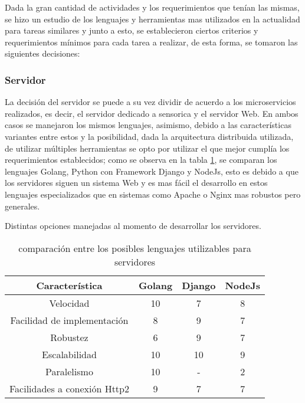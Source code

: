    Dada la gran cantidad de actividades y los requerimientos que tenían las mismas,
    se hizo un estudio de los lenguajes y herramientas mas utilizados en
    la actualidad para tareas similares y junto a esto, se establecieron
    ciertos criterios y requerimientos mínimos para cada tarea a realizar, de
    esta forma, se tomaron las siguientes decisiones:

    \subsubsection{Servidor}
    La decisión del servidor se puede a su vez dividir de acuerdo a los
    microservicios realizados, es decir, el servidor dedicado a sensorica y
    el servidor Web. En ambos casos se manejaron los mismos lenguajes, asimismo, debido a
    las características variantes entre estos y la posibilidad, dada la arquitectura
    distribuida utilizada, de utilizar múltiples herramientas se opto por utilizar
    el que mejor cumplía los requerimientos establecidos; como se observa en la
    tabla \ref{tab:LenguajesServidor}, se comparan los lenguajes Golang, Python
    con Framework Django y NodeJs, esto es debido a que los servidores siguen un
    sistema Web y es mas fácil el desarrollo en estos lenguajes especializados que
    en sistemas como Apache o Nginx mas robustos pero generales.

    \begin{table}[ht]
        \caption[Comparativa de posibles lenguajes nivel servidor]{comparación entre
        los posibles lenguajes utilizables para servidores}
        \label{tab:LenguajesServidor}
        \begin{center}
            Distintas opciones manejadas al momento de desarrollar los servidores.\\

            \vspace{0.3cm}
            \begin{tabular}{|c|c|c|c|}
                \hline
                Característica              & Golang & Django & NodeJs\\\hline
                Velocidad                   & 10    & 7     &   8   \\\hline
                Facilidad de implementación & 8     & 9     &  7\\\hline
                Robustez                    & 6     & 9     & 7 \\\hline
                Escalabilidad               & 10    & 10    & 9 \\\hline
                Paralelismo                 & 10    & -     & 2 \\\hline
                Facilidades a conexión Http2& 9     &7      & 7 \\
                \hline
            \end{tabular}
        \end{center}
    \end{table}


